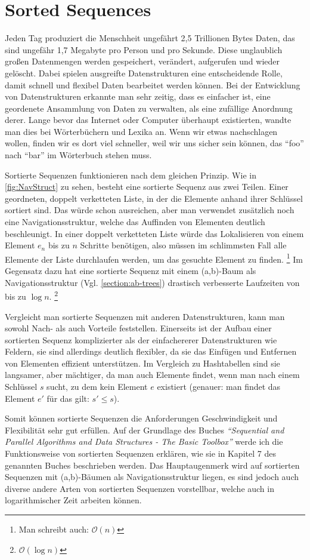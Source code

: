 
\chapter{Sorted Sequences}

Jeden Tag produziert die Menschheit ungefährt 2,5 Trillionen Bytes Daten, das sind ungefähr 1,7 Megabyte pro Person und pro Sekunde.\cite{techjury:20} Diese unglaublich großen Datenmengen werden gespeichert, verändert, aufgerufen und wieder gelöscht. Dabei spielen ausgreifte Datenstrukturen eine entscheidende Rolle, damit schnell und flexibel Daten bearbeitet werden können. Bei der Entwicklung von Datenstrukturen erkannte man sehr zeitig, dass es einfacher ist, eine geordenete Ansammlung von Daten zu verwalten, als eine zufällige Anordnung derer. Lange bevor das Internet oder Computer überhaupt existierten, wandte man dies bei Wörterbüchern und Lexika an. Wenn wir etwas nachschlagen wollen, finden wir es dort viel schneller, weil wir uns sicher sein können, das "`foo"' nach "`bar"' im Wörterbuch stehen muss.
\par
Sortierte Sequenzen funktionieren nach dem gleichen Prinzip. Wie in \autoref{fig:NavStruct} zu sehen, besteht eine sortierte Sequenz aus zwei Teilen. Einer geordneten, doppelt verketteten Liste, in der die Elemente anhand ihrer Schlüssel sortiert sind. Das würde schon ausreichen, aber man verwendet zusätzlich noch eine Navigationsstruktur, welche das Auffinden von Elementen deutlich beschleunigt. In einer doppelt verketteten Liste würde das Lokalisieren von einem Element $e_n$ bis zu $n$ Schritte benötigen, also müssen im schlimmsten Fall alle Elemente der Liste durchlaufen werden, um das gesuchte Element zu finden. \footnote{Man schreibt auch: $\mathcal{O} (n)$} Im Gegensatz dazu hat eine sortierte Sequenz mit einem (a,b)-Baum als Navigationsstruktur (Vgl. \autoref{section:ab-trees}) drastisch verbesserte Laufzeiten von bis zu $\log n$. \footnote{$\mathcal{O} (\log n)$} \cite{Sanders:19}
\par
Vergleicht man sortierte Sequenzen mit anderen Datenstrukturen, kann man sowohl Nach- als auch Vorteile feststellen. Einerseits ist der Aufbau einer sortierten Sequenz komplizierter als der einfachererer Datenstrukturen wie Feldern, sie sind allerdings deutlich flexibler, da sie das Einfügen und Entfernen von Elementen effizient unterstützen. Im Vergleich zu Hashtabellen sind sie langsamer, aber mächtiger, da man auch Elemente findet, wenn man nach einem Schlüssel $s$ sucht, zu dem kein Element $e$ existiert (genauer: man findet das Element $e'$ für das gilt: $s'\leq s$).
\par
Somit können sortierte Sequenzen die Anforderungen Geschwindigkeit und Flexibilität sehr gut erfüllen. Auf der Grundlage des Buches \textit{"`Sequential and Parallel Algorithms and Data Structures - The Basic Toolbox"'} \cite{Sanders:19} werde ich die Funktionsweise von sortierten Sequenzen erklären, wie sie in Kapitel 7 des genannten Buches beschrieben werden. Das Hauptaugenmerk wird auf sortierten Sequenzen mit (a,b)-Bäumen als Navigationsstruktur liegen, es sind jedoch auch diverse andere Arten von sortierten Sequenzen vorstellbar, welche auch in logarithmischer Zeit arbeiten können.

